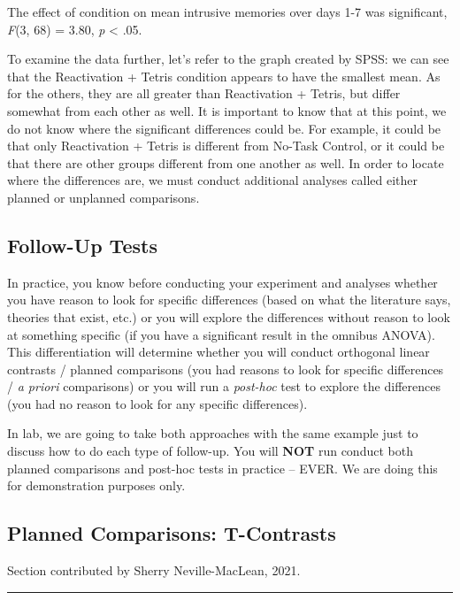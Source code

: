 \documentclass[
]{book}
\begin{document}
The effect of condition on mean intrusive memories over days 1-7 was significant, \emph{F}(3, 68) = 3.80, \emph{p} \textless{} .05.

To examine the data further, let's refer to the graph created by SPSS: we can see that the Reactivation + Tetris condition appears to have the smallest mean. As for the others, they are all greater than Reactivation + Tetris, but differ somewhat from each other as well. It is important to know that at this point, we do not know where the significant differences could be. For example, it could be that only Reactivation + Tetris is different from No-Task Control, or it could be that there are other groups different from one another as well. In order to locate where the differences are, we must conduct additional analyses called either planned or unplanned comparisons.

\hypertarget{follow-up-tests}{%
\subsection{Follow-Up Tests}\label{follow-up-tests}}

In practice, you know before conducting your experiment and analyses whether you have reason to look for specific differences (based on what the literature says, theories that exist, etc.) or you will explore the differences without reason to look at something specific (if you have a significant result in the omnibus ANOVA). This differentiation will determine whether you will conduct orthogonal linear contrasts / planned comparisons (you had reasons to look for specific differences / \emph{a priori} comparisons) or you will run a \emph{post-hoc} test to explore the differences (you had no reason to look for any specific differences).

In lab, we are going to take both approaches with the same example just to discuss how to do each type of follow-up. You will \textbf{NOT} run conduct both planned comparisons and post-hoc tests in practice -- EVER. We are doing this for demonstration purposes only.

\hypertarget{planned-comparisons-t-contrasts}{%
\subsection{Planned Comparisons: T-Contrasts}\label{planned-comparisons-t-contrasts}}

Section contributed by Sherry Neville-MacLean, 2021.

\begin{center}\rule{0.5\linewidth}{0.5pt}\end{center}
\end{document}
